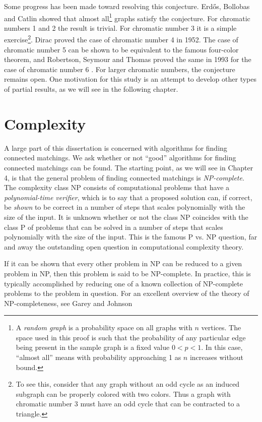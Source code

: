 Some progress has been made toward resolving this conjecture.  Erd\H{o}s, Bollobas and Catlin \cite{hadwiger_aa} showed that almost all\footnote{ A {\it random graph} is a probability space on all graphs with $n$ vertices.  The space used in this proof is such that  the probability of any particular edge being present in the sample graph is a fixed value $0< p < 1$.  In this case, ``almost all'' means with probability approaching 1 as $n$ increases without bound. } graphs satisfy the conjecture.  For chromatic numbers 1 and 2 the result is trivial.  For chromatic number 3  it is a simple exercise\footnote{To see this, consider that any graph without an odd cycle as an induced subgraph can be properly colored with two colors.  Thus a graph with chromatic number 3 must have an odd cycle that can be contracted to a triangle.}.   Dirac \cite{dirac} proved the case of chromatic number 4 in 1952.  The case of chromatic number 5 can be shown to be equivalent to the famous four-color theorem, and Robertson, Seymour and Thomas proved the same in 1993 for the case of chromatic number 6 \cite{HCK6}.  For larger chromatic numbers, the conjecture remains open.  One motivation for this study is an attempt to develop other types of partial results, as we will see in the following chapter.

\section{Complexity}
A large part of this dissertation is concerned with algorithms for finding connected matchings.  We ask whether or not ``good'' algorithms for finding connected matchings can be found.  The starting point, as we will see in Chapter 4, is that the general problem of finding connected matchings is {\it NP-complete}.  The complexity class NP consists of computational problems that have a {\it polynomial-time verifier}, which is to say that a proposed solution can, if correct, be {\em shown} to be correct in a number of steps that scales polynomially with the size of the input.  It is unknown whether or not the class NP coincides with the class P of problems that can be solved in a number of steps that scales polynomially with the size of the input.  This is the famous P vs. NP question, far and away the outstanding open question in computational complexity theory.

If it can be shown that every other problem in NP can be reduced to a given problem in NP, then this problem is said to be NP-complete.  In practice, this is typically accomplished by reducing one of a known collection of NP-complete problems to the problem in question.  For an excellent overview of the theory of NP-completeness, see Garey and Johnson \cite{npcomplete}  

